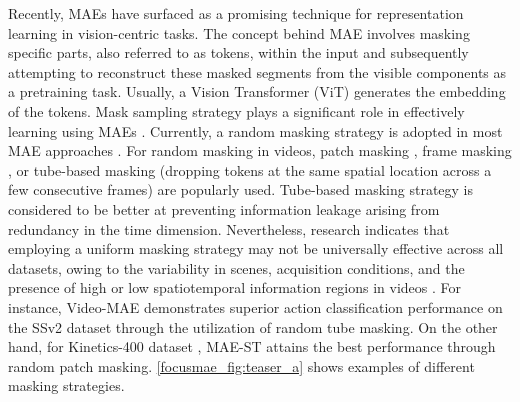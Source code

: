 %
Recently, MAEs \cite{adamae, maest, mgmae, videomae, videomaev2} have surfaced as a promising technique for representation learning in vision-centric tasks. 
The concept behind MAE involves masking specific parts, also referred to as tokens, within the input and subsequently attempting to reconstruct these masked segments from the visible components as a pretraining task. Usually, a Vision Transformer (ViT) \cite{vit} generates the embedding of the tokens. Mask sampling strategy plays a significant role in effectively learning using MAEs \cite{maest, videomae}. Currently, a random masking strategy is adopted in most MAE approaches \cite{maest, videomae, videomaev2}. For random masking in videos, patch masking \cite{maest}, frame masking \cite{qian2021spatiotemporal, wei2022masked}, or tube-based masking (dropping tokens at the same spatial location across a few consecutive frames) \cite{videomae} are popularly used. Tube-based masking strategy is considered to be better at preventing information leakage arising from redundancy in the time dimension. %
Nevertheless, research indicates that employing a uniform masking strategy may not be universally effective across all datasets, owing to the variability in scenes, acquisition conditions, and the presence of high or low spatiotemporal information regions in videos \cite{adamae}. For instance, Video-MAE demonstrates superior action classification performance on the SSv2 dataset \cite{ssv2} through the utilization of random tube masking. On the other hand, for Kinetics-400 dataset \cite{kinetics}, MAE-ST attains the best performance through random patch masking. \cref{focusmae_fig:teaser_a} shows examples of different masking strategies. 
